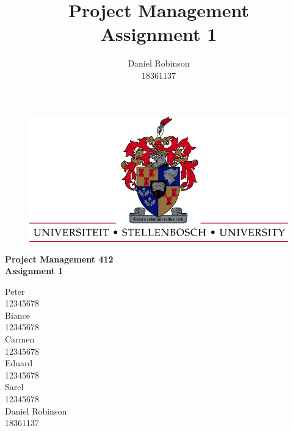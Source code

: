 


\title{Project Management\\Assignment 1}
\author{Daniel Robinson\\18361137}


    \begin{titlepage}
        \begin{center}
            \vspace*{1cm}
            
            \begin{figure}
			\centering
            \includegraphics[scale=2]{UScrest-top.jpg}
            \end{figure}
            
            \huge
            \textbf{Project Management 412\\Assignment 1}
            
            \vspace{1.5cm}
            
            \large
            Peter\\
            12345678\\
            \vspace{0.5cm}
            Biance\\
            12345678\\
            \vspace{0.5cm}
            Carmen\\
            12345678\\
            \vspace{0.5cm}
            Eduard\\
            12345678\\
            \vspace{0.5cm}
            Sarel\\
            12345678\\
            \vspace{0.5cm}
            Daniel Robinson\\
            18361137\\
            \vspace{3.5cm}
            

\end{center}
\end{titlepage}
